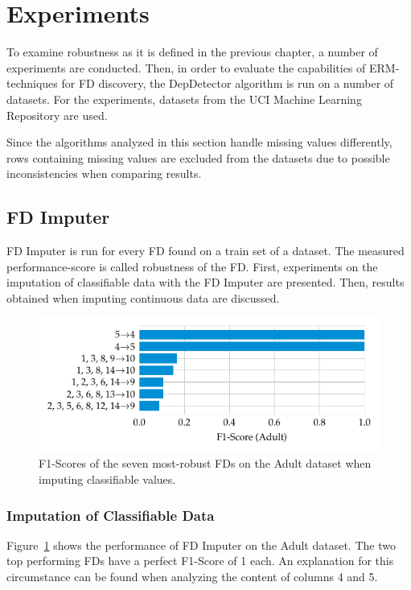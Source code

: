 \section{Experiments}
To examine robustness as it is defined in the previous chapter, a number of experiments are conducted.
Then, in order to evaluate the capabilities of ERM-techniques for FD discovery, the DepDetector algorithm is run on a number of datasets.
For the experiments, datasets from the UCI Machine Learning Repository are used.~\cite{DUA19}

Since the algorithms analyzed in this section handle missing values differently, rows containing missing values are excluded from the datasets due to possible inconsistencies when comparing results.

\subsection{FD Imputer}
FD Imputer is run for every FD found on a train set of a dataset.
The measured performance-score is called robustness of the FD.
First, experiments on the imputation of classifiable data with the FD Imputer are presented.
Then, results obtained when imputing continuous data are discussed.

\begin{figure}[ht]
     \centering
     \includegraphics[width=\textwidth]{../figures/adult/f1_fd_imputer.pdf}
     \caption{F1-Scores of the seven most-robust FDs on the Adult dataset when imputing classifiable values.}
     \label{fig:f1_fd_adult}
\end{figure}

\subsubsection{Imputation of Classifiable Data}
Figure~\ref{fig:f1_fd_adult} shows the performance of FD Imputer on the Adult dataset.
The two top performing FDs have a perfect F1-Score of 1 each.
An explanation for this circumstance can be found when analyzing the content of columns 4 and 5.

